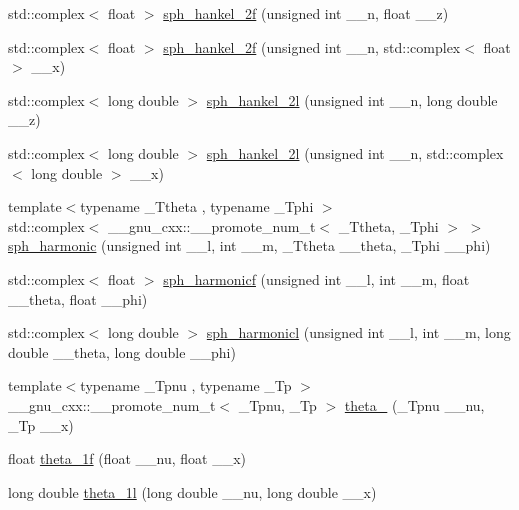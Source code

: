 \begin{DoxyCompactItemize}
\item 
std\+::complex$<$ float $>$ \hyperlink{namespace____gnu__cxx_a9496b81f94b8ba0162cf45df72be1e71}{sph\+\_\+hankel\+\_\+2f} (unsigned int \+\_\+\+\_\+n, float \+\_\+\+\_\+z)
\item 
std\+::complex$<$ float $>$ \hyperlink{namespace____gnu__cxx_a4c3194b71831b265811f987cbbf6e031}{sph\+\_\+hankel\+\_\+2f} (unsigned int \+\_\+\+\_\+n, std\+::complex$<$ float $>$ \+\_\+\+\_\+x)
\item 
std\+::complex$<$ long double $>$ \hyperlink{namespace____gnu__cxx_a6d3ead73a4f0bfeeb0aa1fd99daaf3b1}{sph\+\_\+hankel\+\_\+2l} (unsigned int \+\_\+\+\_\+n, long double \+\_\+\+\_\+z)
\item 
std\+::complex$<$ long double $>$ \hyperlink{namespace____gnu__cxx_a3d9d9aaceba455a5ddc79d178ee1cb6d}{sph\+\_\+hankel\+\_\+2l} (unsigned int \+\_\+\+\_\+n, std\+::complex$<$ long double $>$ \+\_\+\+\_\+x)
\item 
{\footnotesize template$<$typename \+\_\+\+Ttheta , typename \+\_\+\+Tphi $>$ }\\std\+::complex$<$ \+\_\+\+\_\+gnu\+\_\+cxx\+::\+\_\+\+\_\+promote\+\_\+num\+\_\+t$<$ \+\_\+\+Ttheta, \+\_\+\+Tphi $>$ $>$ \hyperlink{namespace____gnu__cxx_a28f1390a0366bc8c9780918d9720146b}{sph\+\_\+harmonic} (unsigned int \+\_\+\+\_\+l, int \+\_\+\+\_\+m, \+\_\+\+Ttheta \+\_\+\+\_\+theta, \+\_\+\+Tphi \+\_\+\+\_\+phi)
\item 
std\+::complex$<$ float $>$ \hyperlink{namespace____gnu__cxx_a062b1156f5646fe42719439bb3dcc9e5}{sph\+\_\+harmonicf} (unsigned int \+\_\+\+\_\+l, int \+\_\+\+\_\+m, float \+\_\+\+\_\+theta, float \+\_\+\+\_\+phi)
\item 
std\+::complex$<$ long double $>$ \hyperlink{namespace____gnu__cxx_a414c8374b4579aa14e38f5401304b6fa}{sph\+\_\+harmonicl} (unsigned int \+\_\+\+\_\+l, int \+\_\+\+\_\+m, long double \+\_\+\+\_\+theta, long double \+\_\+\+\_\+phi)
\item 
{\footnotesize template$<$typename \+\_\+\+Tpnu , typename \+\_\+\+Tp $>$ }\\\+\_\+\+\_\+gnu\+\_\+cxx\+::\+\_\+\+\_\+promote\+\_\+num\+\_\+t$<$ \+\_\+\+Tpnu, \+\_\+\+Tp $>$ \hyperlink{namespace____gnu__cxx_a936eef7d11580bef855f98789bbbfe50}{theta\+\_} (\+\_\+\+Tpnu \+\_\+\+\_\+nu, \+\_\+\+Tp \+\_\+\+\_\+x)
\item 
float \hyperlink{namespace____gnu__cxx_a5bbf256b875da28132f9049f5984cb14}{theta\+\_\+1f} (float \+\_\+\+\_\+nu, float \+\_\+\+\_\+x)
\item 
long double \hyperlink{namespace____gnu__cxx_a3520684c78771ffa57180060c8b6d1ca}{theta\+\_\+1l} (long double \+\_\+\+\_\+nu, long double \+\_\+\+\_\+x)

\end{DoxyCompactItemize}
